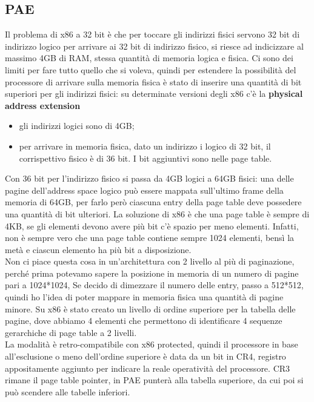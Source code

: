 \documentclass[12pt, oneside]{extbook}
\begin{document}
\subsection{PAE}
Il problema di x86 a 32 bit è che per toccare gli indirizzi fisici servono 32 bit di indirizzo logico per arrivare ai 32 bit di indirizzo fisico, si riesce ad indicizzare al massimo 4GB di RAM, stessa quantità di memoria logica e fisica. Ci sono dei limiti per fare tutto quello che si voleva, quindi per estendere la possibilità del processore di arrivare sulla memoria fisica è stato di inserire una quantità di bit superiori per gli indirizzi fisici: su determinate versioni degli x86 c'è la \textbf{physical address extension}
\begin{itemize}
\item gli indirizzi logici sono di 4GB;
\item per arrivare in memoria fisica, dato un indirizzo i logico di 32 bit, il corrispettivo fisico è di 36 bit. I bit aggiuntivi sono nelle page table.
\end{itemize}
Con 36 bit per l'indirizzo fisico si passa da 4GB logici a 64GB fisici: una delle pagine dell'address space logico può essere mappata sull'ultimo frame della memoria di 64GB, per farlo però ciascuna entry della page table deve possedere una quantità di bit ulteriori. La soluzione di x86 è che una page table è sempre di 4KB, se gli elementi devono avere più bit c'è spazio per meno elementi. Infatti, non è sempre vero che una page table contiene sempre 1024 elementi, bensì la metà e ciascun elemento ha più bit a disposizione.\\ Non ci piace questa cosa in un'architettura con 2 livello al più di paginazione, perché prima potevamo sapere la posizione in memoria di un numero di pagine pari a 1024*1024, Se decido di dimezzare il numero delle entry, passo a 512*512, quindi ho l'idea di poter mappare in memoria fisica una quantità di pagine minore. Su x86 è stato creato un livello di ordine superiore per la tabella delle pagine, dove abbiamo 4 elementi che permettono di identificare 4 sequenze gerarchiche di page table a 2 livelli.\\ La modalità è retro-compatibile con x86 protected, quindi il processore in base all'esclusione o meno dell'ordine superiore è data da un bit in CR4, registro appositamente aggiunto per indicare la reale operatività del processore. CR3 rimane il page table pointer, in PAE punterà alla tabella superiore, da cui poi si può scendere alle tabelle inferiori.
\end{document}
